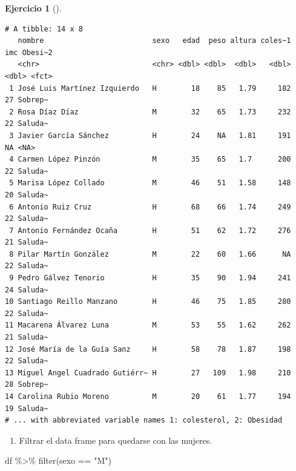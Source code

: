 \documentclass[
  a4paper,
]{scrreport}
\newenvironment{Shaded}{\begin{snugshade}}{\end{snugshade}}
\newcommand{\FunctionTok}[1]{\textcolor[rgb]{0.28,0.35,0.67}{#1}}
\newcommand{\NormalTok}[1]{\textcolor[rgb]{0.00,0.23,0.31}{#1}}
\newcommand{\SpecialCharTok}[1]{\textcolor[rgb]{0.37,0.37,0.37}{#1}}
\newcommand{\StringTok}[1]{\textcolor[rgb]{0.13,0.47,0.30}{#1}}
\providecommand{\tightlist}{%
  \setlength{\itemsep}{0pt}\setlength{\parskip}{0pt}}\usepackage{longtable,booktabs,array}
\theoremstyle{definition}
\newtheorem{exercise}{Ejercicio}[chapter]
\theoremstyle{remark}
\begin{document}
\begin{exercise}[]
\begin{tcolorbox}
\begin{verbatim}
# A tibble: 14 x 8
   nombre                         sexo   edad  peso altura coles~1   imc Obesi~2
   <chr>                          <chr> <dbl> <dbl>  <dbl>   <dbl> <dbl> <fct>  
 1 José Luis Martínez Izquierdo   H        18    85   1.79     182    27 Sobrep~
 2 Rosa Díaz Díaz                 M        32    65   1.73     232    22 Saluda~
 3 Javier García Sánchez          H        24    NA   1.81     191    NA <NA>   
 4 Carmen López Pinzón            M        35    65   1.7      200    22 Saluda~
 5 Marisa López Collado           M        46    51   1.58     148    20 Saluda~
 6 Antonio Ruiz Cruz              H        68    66   1.74     249    22 Saluda~
 7 Antonio Fernández Ocaña        H        51    62   1.72     276    21 Saluda~
 8 Pilar Martín González          M        22    60   1.66      NA    22 Saluda~
 9 Pedro Gálvez Tenorio           H        35    90   1.94     241    24 Saluda~
10 Santiago Reillo Manzano        H        46    75   1.85     280    22 Saluda~
11 Macarena Álvarez Luna          M        53    55   1.62     262    21 Saluda~
12 José María de la Guía Sanz     H        58    78   1.87     198    22 Saluda~
13 Miguel Angel Cuadrado Gutiérr~ H        27   109   1.98     210    28 Sobrep~
14 Carolina Rubio Moreno          M        20    61   1.77     194    19 Saluda~
# ... with abbreviated variable names 1: colesterol, 2: Obesidad
\end{verbatim}

\end{tcolorbox}

\begin{enumerate}
\def\labelenumi{\alph{enumi}.}
\setcounter{enumi}{6}
\tightlist
\item
  Filtrar el data frame para quedarse con las mujeres.
\end{enumerate}

\begin{tcolorbox}[enhanced jigsaw, rightrule=.15mm, toptitle=1mm, colbacktitle=quarto-callout-tip-color!10!white, titlerule=0mm, colback=white, leftrule=.75mm, bottomtitle=1mm, colframe=quarto-callout-tip-color-frame, breakable, title=\textcolor{quarto-callout-tip-color}{\faLightbulb}\hspace{0.5em}{Solución}, arc=.35mm, coltitle=black, opacityback=0, bottomrule=.15mm, opacitybacktitle=0.6, left=2mm, toprule=.15mm]

\begin{Shaded}
\begin{Highlighting}[]
\NormalTok{df }\SpecialCharTok{\%\textgreater{}\%}
    \FunctionTok{filter}\NormalTok{(sexo }\SpecialCharTok{==} \StringTok{"M"}\NormalTok{)}
\end{Highlighting}
\end{Shaded}


\end{tcolorbox}
\end{exercise}
\end{document}
